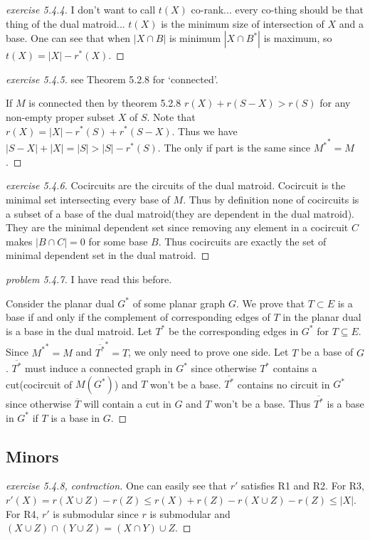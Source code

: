 \begin{proof}[exercise 5.4.4]
    I don't want to call $t(X)$ co-rank... every co-thing should be that thing of the dual matroid... $t(X)$ is the minimum size of intersection of $X$ and a base. One can see that when $|X\cap B|$ is minimum $|X\cap B^*|$ is maximum, so $t(X)=|X|-r^*(X)$.
\end{proof}
\begin{proof}[exercise 5.4.5]
    see Theorem 5.2.8 for `connected'.

    If $M$ is connected then by theorem 5.2.8 $r(X)+r(S-X)> r(S)$ for any non-empty proper subset $X$ of $S$. Note that $r(X)=|X|-r^*(S)+r^*(S-X)$. Thus we have $|S-X|+|X|=|S|>|S|-r^*(S)$. The only if part is the same since ${M^*}^*=M$.
\end{proof}
\begin{proof}[exercise 5.4.6]
    Cocircuits are the circuits of the dual matroid. Cocircuit is the minimal set intersecting every base of $M$. Thus by definition none of cocircuits is a subset of a base of the dual matroid(they are dependent in the dual matroid). They are the minimal dependent set since removing any element in a cocircuit $C$ makes $|B\cap C|=0$ for some base $B$. Thus cocircuits are exactly the set of minimal dependent set in the dual matroid.
\end{proof}
\begin{proof}[problem 5.4.7]
    I have read this before.

    Consider the planar dual $G^*$ of some planar graph $G$. We prove that $T\subset E$ is a base if and only if the complement of corresponding edges of $T$ in the planar dual is a base in the dual matroid. Let $T^*$ be the corresponding edges in $G^*$ for $T\subseteq E$. Since ${M^*}^*=M$ and $\overline{\overline{T^*}^*}=T$, we only need to prove one side. Let $T$ be a base of $G$. $\overline{T^*}$ must induce a connected graph in $G^*$ since otherwise $T^*$ contains a cut(cocircuit of $M(G^*)$) and $T$ won't be a base. $\overline{T^*}$ contains no circuit in $G^*$ since otherwise $\overline{T}$ will contain a cut in $G$ and $T$ won't be a base. Thus $\overline{T^*}$ is a base in $G^*$ if $T$ is a base in $G$.
\end{proof}
\subsection{Minors}
\begin{proof}[exercise 5.4.8, contraction]
    One can easily see that $r'$ satisfies R1 and R2. For R3, $r'(X)=r(X\cup Z)-r(Z)\leq r(X)+r(Z)-r(X\cup Z)-r(Z)\leq |X|$. For R4, $r'$ is submodular since $r$ is submodular and $(X\cup Z) \cap (Y\cup Z)=(X\cap Y)\cup Z$.
\end{proof}


